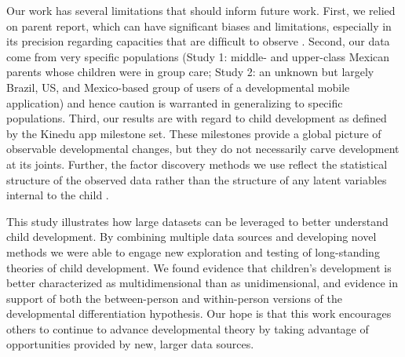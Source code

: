 \documentclass[man, floatsintext]{apa7}
\begin{document}
Our work has several limitations that should inform future work. First,
we relied on parent report, which can have signiﬁcant biases and
limitations, especially in its precision regarding capacities that are
difﬁcult to observe \parencite[e.g., cognitive abilities;][]{frank2021,feldman2000}. Second, our
data come from very speciﬁc populations (Study 1: middle- and
upper-class Mexican parents whose children were in group care; Study 2:
an unknown but largely Brazil, US, and Mexico-based group of users of a developmental mobile application) and hence
caution is warranted in generalizing to specific populations. Third, our results are with regard to child development
as deﬁned by the Kinedu app milestone set. These milestones provide a global picture of observable developmental changes, but they do not necessarily carve development at its joints. Further, the factor discovery methods we use reflect the statistical structure of the observed data rather than the structure of any latent variables internal to the child \parencite{bork2017,maraun2003,van-der-maas2006}.

This study illustrates how 
large datasets can be leveraged to better understand child development. By
combining multiple data sources and developing novel methods we
were able to engage new exploration and testing of long-standing theories of child development. We found evidence that children's development is better characterized as multidimensional than as unidimensional, and evidence in support of both the between-person and within-person versions of the 
developmental differentiation hypothesis. Our hope is
that this work encourages others to continue to advance developmental
theory by taking advantage of opportunities provided by new, 
larger data sources.

\printbibliography
\end{document}
